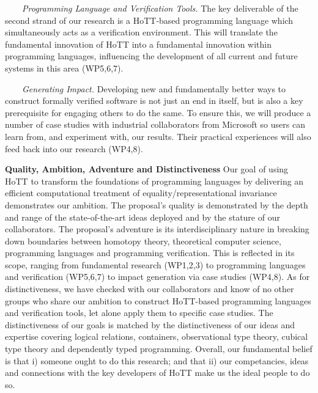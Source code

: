 \documentclass[a4paper,11pt]{article}
\begin{document}
$\;\;\;\;\;\;$ {\em Programming Language and Verification Tools.} The key
  deliverable of the second strand of our research is a HoTT-based
  programming language which simultaneously acts as a verification
  environment. This will translate the fundamental innovation of HoTT
  into a fundamental innovation within programming languages,
  influencing the development of all current and future systems in
  this area (WP5,6,7).

  $\;\;\;\;\;\;$ {\em Generating Impact.} Developing new and
  fundamentally better ways to construct formally verified software is
  not just an end in itself, but is also a key prerequisite for
  engaging others to do the same.  To ensure this, we will produce a
  number of case studies with industrial collaborators from Microsoft so users can
  learn from, and experiment with, our results. Their practical
  experiences will also feed back into our research (WP4,8).

  {\bf Quality, Ambition, Adventure and Distinctiveness} Our goal of
  using HoTT to transform the foundations of programming languages by
  delivering an efficient computational treatment of
  equality/representational invariance demonstrates our ambition. The
  proposal's quality is demonstrated by the depth and range of the
  state-of-the-art ideas deployed and by the stature of our
  collaborators. The proposal's adventure is its interdisciplinary
  nature in breaking down boundaries between homotopy theory, theoretical
  computer science, programming languages and programming
  verification. This is reflected in its scope, ranging from
  fundamental research (WP1,2,3) to programming languages and
  verification (WP5,6,7) to impact generation via case studies
  (WP4,8). As for distinctiveness, we have checked with our
  collaborators and know of no other groups who share our ambition to
  construct HoTT-based programming languages and verification tools,
  let alone apply them to specific case studies. The distinctiveness of our goals is
  matched by the distinctiveness of our ideas and expertise covering
  logical relations, containers, observational type theory, cubical
  type theory and dependently typed programming. Overall, our
  fundamental belief is that i) someone ought to do this research; and
  that ii) our competancies, ideas and connections with the key developers
  of HoTT make us the ideal people to do so.


\end{document}
